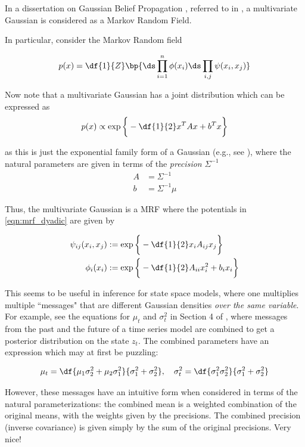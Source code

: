 \documentclass{article} %
\newcommand{\selfpotential}{\phi}
\newcommand{\edgepotential}{\psi}
\begin{document}
In a dissertation on Gaussian Belief Propagation \cite{bickson2008gaussian}, referred to in \cite{krishnan2016structured}, a multivariate Gaussian is considered as a Markov Random Field. 

In particular, consider the Markov Random field

\begin{equation}
p(x) = \df{1}{Z}\bp{ \ds\prod_{i=1}^n \selfpotential(x_i) \ds\prod_{i,j} \edgepotential(x_i, x_j)  } 
\label{eqn:mrf_dyadic}
\end{equation}

Now note that a multivariate Gaussian has a joint distribution which can be expressed as
\[ p(x) \propto \exp \bigg\{ -\df{1}{2} x^T A x + b^T x \bigg\} \]

as this is just the exponential family form of a Gaussian (e.g., see  \cite{englehardt_gaussian_models}), where the natural parameters are
given in terms of the \textit{precision} $\Sigma^{-1}$
\begin{align*}
A &= \Sigma^{-1} \\
b &= \Sigma^{-1} \mu
\end{align*}

Thus, the multivariate Gaussian is a MRF where the potentials in \eqref{eqn:mrf_dyadic} are given by

\begin{align*}
\edgepotential_{ij}(x_i, x_j) & := \exp \bigg\{ -\df{1}{2} x_i A_{ij} x_j \bigg\}  \\
\selfpotential_{i}(x_i) & := \exp \bigg\{ -\df{1}{2} A_{ii} x_i^2 + b_i x_i \bigg\}  
\end{align*}

This seems to be useful in inference for state space models, where one multiplies multiple ``messages" that are different Gaussian densities \textit{over the same variable}.   For example, see  the equations for $\mu_t$ and $\sigma^2_t$ in Section 4 of \cite{krishnan2016structured}, where messages from the past and the future of a time series model are combined to get a posterior distribution on the state $z_t$.   The combined parameters have an expression which may at first be puzzling:

\[ \mu_t = \df{\mu_1 \sigma^2_2 + \mu_2 \sigma^2_1}{\sigma^2_1 + \sigma^2_2}  , \quad \sigma^2_t = \df{\sigma^2_1 \sigma^2_2}{ \sigma^2_1 + \sigma^2_2} \]

However, these messages have an intuitive form when considered in terms of the natural parameterizations:  the combined mean is a weighted combination of the original means, with the weights given by the precisions.   The combined precision (inverse covariance) is given simply by the sum of the original precisions.  Very nice! 
\end{document}
